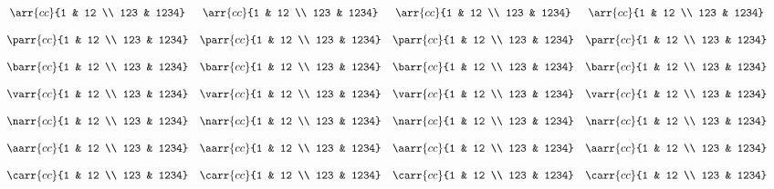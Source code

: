 \documentclass{unittest}
\begin{document}
\(\begin{array}{ccccc}
\\\\%
&	\arr{cc}{1 & 12 \\ 123 & 1234}
&	\arr{cc}{1 & 12 \\ 123 & 1234}
&	\arr{cc}{1 & 12 \\ 123 & 1234}
&	\arr{cc}{1 & 12 \\ 123 & 1234}
\\\\%
&	\parr{cc}{1 & 12 \\ 123 & 1234}
&	\parr{cc}{1 & 12 \\ 123 & 1234}
&	\parr{cc}{1 & 12 \\ 123 & 1234}
&	\parr{cc}{1 & 12 \\ 123 & 1234}
\\\\%
&	\barr{cc}{1 & 12 \\ 123 & 1234}
&	\barr{cc}{1 & 12 \\ 123 & 1234}
&	\barr{cc}{1 & 12 \\ 123 & 1234}
&	\barr{cc}{1 & 12 \\ 123 & 1234}
\\\\%
&	\varr{cc}{1 & 12 \\ 123 & 1234}
&	\varr{cc}{1 & 12 \\ 123 & 1234}
&	\varr{cc}{1 & 12 \\ 123 & 1234}
&	\varr{cc}{1 & 12 \\ 123 & 1234}
\\\\%
&	\narr{cc}{1 & 12 \\ 123 & 1234}
&	\narr{cc}{1 & 12 \\ 123 & 1234}
&	\narr{cc}{1 & 12 \\ 123 & 1234}
&	\narr{cc}{1 & 12 \\ 123 & 1234}
\\\\%
&	\aarr{cc}{1 & 12 \\ 123 & 1234}
&	\aarr{cc}{1 & 12 \\ 123 & 1234}
&	\aarr{cc}{1 & 12 \\ 123 & 1234}
&	\aarr{cc}{1 & 12 \\ 123 & 1234}
\\\\%
&	\carr{cc}{1 & 12 \\ 123 & 1234}
&	\carr{cc}{1 & 12 \\ 123 & 1234}
&	\carr{cc}{1 & 12 \\ 123 & 1234}
&	\carr{cc}{1 & 12 \\ 123 & 1234}
\\\\%
\end{array}\)
\end{document}
